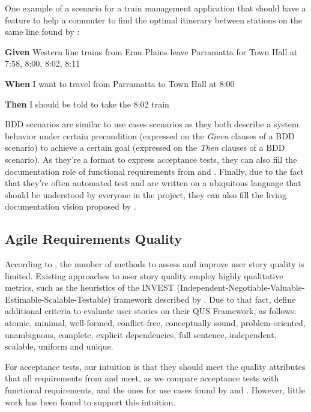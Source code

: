 One example of a scenario for a train management application that should have a feature to help a commuter to find the optimal itinerary between stations on the same line found by \cite{Smart_2014}:

\begin{framed}
\textbf{Given} Western line trains from Emu Plains leave Parramatta for Town Hall at 7:58, 8:00, 8:02, 8:11

\textbf{When} I want to travel from Parramatta to Town Hall at 8:00

\textbf{Then} I should be told to take the 8:02 train
\end{framed}

BDD scenarios are similar to use cases scenarios as they both describe a system behavior under certain precondition (expressed on the \textit{Given} clauses of a BDD scenario) to achieve a certain goal (expressed on the \textit{Then} clauses of a BDD scenario). As they're a format to express acceptance tests, they can also fill the documentation role of functional requirements from \cite{Babok_2009} and \cite{Babok_2015}. Finally, due to the fact that they're often automated test and are written on a ubiquitous language that should be understood by everyone in the project, they can also fill the living documentation vision proposed by \cite{Adzic_2011}.

\subsection{Agile Requirements Quality}

According to \cite{Lucassen_2015}, the number of methods to assess and improve user story quality is limited. Existing approaches to user story quality employ highly qualitative metrics, such as the heuristics of the INVEST (Independent-Negotiable-Valuable-Estimable-Scalable-Testable) framework described by \cite{Cohn_2004}. Due to that fact, \cite{Lucassen_2015} define additional criteria to evaluate user stories on their QUS Framework, as follows: atomic, minimal, well-formed, conflict-free, conceptually sound, problem-oriented, unambiguous, complete, explicit dependencies, full sentence, independent, scalable, uniform and unique.

For acceptance tests, our intuition is that they should meet the quality attributes that all requirements from \cite{Babok_2009} and \cite{Babok_2015} meet, as we compare acceptance tests with functional requirements, and the ones for use cases found by \cite{Cockburn_2000} and \cite{Phalp_2011}. However, little work has been found to support this intuition. 

